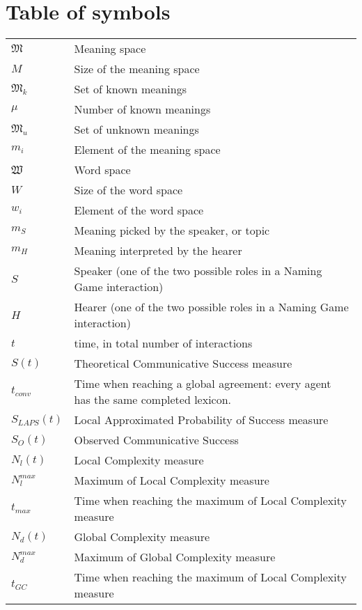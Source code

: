 

\section*{Table of symbols}
\begin{table*}
\begin{tabular}{ll}

$\mathfrak{M}\;\;\;$ & Meaning space\\
$M\;\;\;$ & Size of the meaning space\\
$\mathfrak{M}_k\;\;\;$ & Set of known meanings\\
$\mu\;\;\;$ & Number of known meanings\\
$\mathfrak{M}_u\;\;\;$ & Set of unknown meanings\\
$m_i\;\;\;$ & Element of the meaning space\\
$\mathfrak{W}\;\;\;$ & Word space\\
$W\;\;\;$ & Size of the word space\\
$w_i\;\;\;$ & Element of the word space\\
$m_S\;\;\;$ & Meaning picked by the speaker, or topic\\
$m_H\;\;\;$ & Meaning interpreted by the hearer\\
$S\;\;\;$ & Speaker (one of the two possible roles in a Naming Game interaction)\\
$H\;\;\;$ & Hearer (one of the two possible roles in a Naming Game interaction)\\
$t$ & time, in total number of interactions\\
$S(t)\;\;\;$ & Theoretical Communicative Success measure\\
$t_{conv}\;\;\;$ & Time when reaching a global agreement: every agent has the same completed lexicon.\\
$S_{LAPS}(t)$ & Local Approximated Probability of Success measure\\
$S_{O}(t)$ & Observed Communicative Success\\
$N_l(t)\;\;\;$ & Local Complexity measure\\
$N_l^{max}\;\;\;$ & Maximum of Local Complexity measure\\
$t_{max}\;\;\;$ & Time when reaching the maximum of Local Complexity measure\\
$N_d(t)\;\;\;$ & Global Complexity measure\\
$N_d^{max}\;\;\;$ & Maximum of Global Complexity measure\\
$t_{GC}\;\;\;$ & Time when reaching the maximum of Local Complexity measure\\

\end{tabular}
\end{table*}
